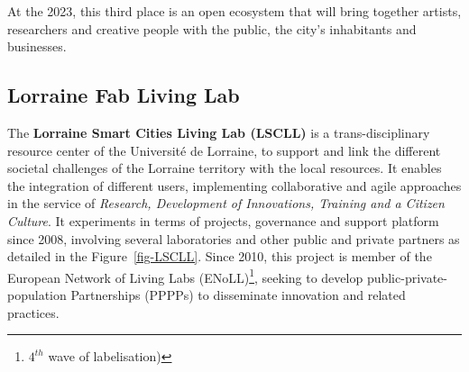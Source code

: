 \documentclass[
  11pt,
]{article}
\begin{document}
At the 2023, this third place is an open ecosystem that will bring
together artists, researchers and creative people with the public, the
city's inhabitants and businesses.

\hypertarget{lorraine-fab-living-lab}{%
\subsection{\texorpdfstring{Lorraine Fab Living
Lab\textregistered}{Lorraine Fab Living Lab}}\label{lorraine-fab-living-lab}}

The \textbf{Lorraine Smart Cities Living Lab (LSCLL)} is a
trans-disciplinary resource center of the Université de Lorraine, to
support and link the different societal challenges of the Lorraine
territory with the local resources. It enables the integration of
different users, implementing collaborative and agile approaches in the
service of \emph{Research, Development of Innovations, Training and a
Citizen Culture}. It experiments in terms of projects, governance and
support platform since 2008, involving several laboratories and other
public and private partners as detailed in the Figure~\ref{fig-LSCLL}.
Since 2010, this project is member of the European Network of Living
Labs (ENoLL)\footnote{\(4^{th}\) wave of labelisation)}, seeking to
develop public-private-population Partnerships (PPPPs) to disseminate
innovation and related practices.
\end{document}
